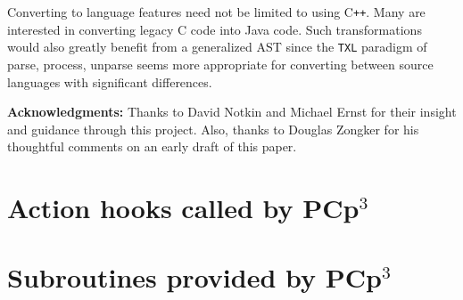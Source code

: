 \documentclass{article}
\newcommand{\pcp}{\mbox{\textsf{PCp}$^3$}}
\newcommand{\CPP}{\mbox{\textsf{C\texttt{++}}}}
\newcommand{\C}{\mbox{\textsf{C}}}
\begin{document}
Converting to language features need not be limited to using \CPP{}.
Many are interested in converting legacy \C{} code into Java code.  Such
transformations would also greatly benefit from a generalized AST since
the \texttt{TXL} paradigm of parse, process, unparse \cite{TXL} seems
more appropriate for converting between source languages with
significant differences.





\vspace{1in}
\noindent \textbf{Acknowledgments:}  Thanks to David Notkin and Michael
Ernst for their insight and guidance through this project.  Also, thanks
to Douglas Zongker for his thoughtful comments on an early draft of this
paper.


\appendix
\newpage

\section{Action hooks called by \pcp}
\begin{footnotesize}
\label{sec:hooks}
\begin{itemize}
\sloppy

\fussy
\end{itemize}
\end{footnotesize}

\newpage

\section{Subroutines provided by \pcp}
\label{sec:backcalls}
\begin{footnotesize}
\begin{itemize}
\sloppy

\fussy
\end{itemize}
\end{footnotesize}
\end{document}
